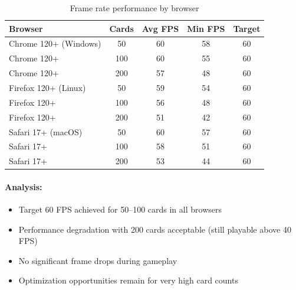\begin{table}[htbp]
    \centering
    \caption{Frame rate performance by browser}
    \label{tab:framerate}
    \begin{tabular}{@{}lcccc@{}}
        \toprule
        \textbf{Browser}      & \textbf{Cards} & \textbf{Avg FPS} & \textbf{Min FPS} & \textbf{Target} \\
        \midrule
        Chrome 120+ (Windows) & 50             & 60               & 58               & 60              \\
        Chrome 120+           & 100            & 60               & 55               & 60              \\
        Chrome 120+           & 200            & 57               & 48               & 60              \\
        \midrule
        Firefox 120+ (Linux)  & 50             & 59               & 54               & 60              \\
        Firefox 120+          & 100            & 56               & 48               & 60              \\
        Firefox 120+          & 200            & 51               & 42               & 60              \\
        \midrule
        Safari 17+ (macOS)    & 50             & 60               & 57               & 60              \\
        Safari 17+            & 100            & 58               & 51               & 60              \\
        Safari 17+            & 200            & 53               & 44               & 60              \\
        \bottomrule
    \end{tabular}
\end{table}

\paragraph*{Analysis:}

\begin{itemize}
    \item Target 60 FPS achieved for 50--100 cards in all browsers
    \item Performance degradation with 200 cards acceptable (still playable above 40 FPS)
    \item No significant frame drops during gameplay
    \item Optimization opportunities remain for very high card counts
\end{itemize}

